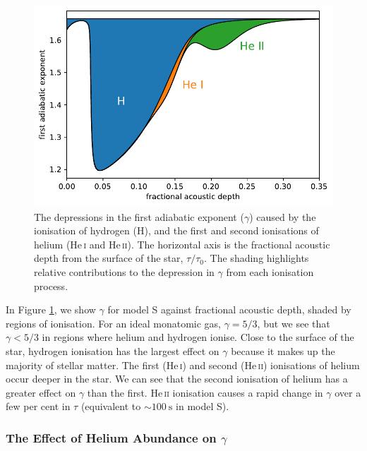 \begin{figure}[tb]
    \centering
    \includegraphics{figures/adiabatic-ionisation-regions.pdf}
    \caption[The depressions in the first adiabatic exponent caused by the ionisation of hydrogen and helium.]{The depressions in the first adiabatic exponent (\(\gamma\)) caused by the ionisation of hydrogen (H), and the first and second ionisations of helium (He\,\textsc{i} and He\,\textsc{ii}). The horizontal axis is the fractional acoustic depth from the surface of the star, \(\tau/\tau_0\). The shading highlights relative contributions to the depression in \(\gamma\) from each ionisation process.}
    \label{fig:gamma-zones}
\end{figure}

In Figure \ref{fig:gamma-zones}, we show \(\gamma\) for model S against fractional acoustic depth, shaded by regions of ionisation. For an ideal monatomic gas, \(\gamma=5/3\), but we see that \(\gamma < 5/3\) in regions where helium and hydrogen ionise. Close to the surface of the star, hydrogen ionisation has the largest effect on \(\gamma\) because it makes up the majority of stellar matter. The first (He\,\textsc{i}) and second (He\,\textsc{ii}) ionisations of helium occur deeper in the star. We can see that the second ionisation of helium has a greater effect on \(\gamma\) than the first. He\,\textsc{ii} ionisation causes a rapid change in \(\gamma\) over a few per cent in \(\tau\) (equivalent to \(\sim \SI{100}{\second}\) in model S).

\subsubsection{The Effect of Helium Abundance on \(\gamma\)}

